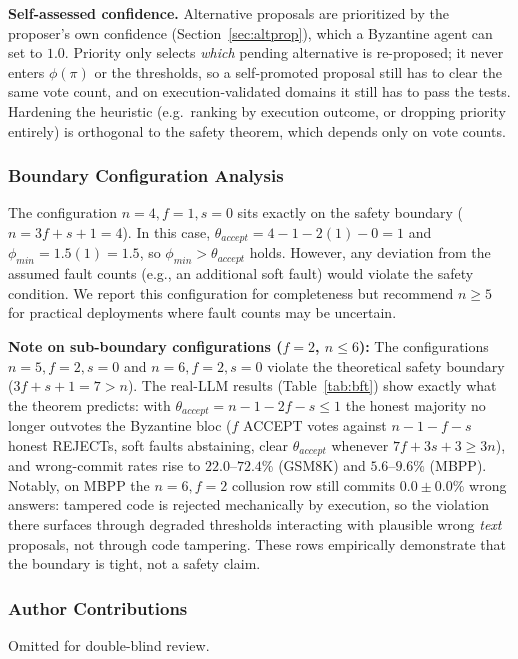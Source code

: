 \documentclass{article}
\begin{document}
\textbf{Self-assessed confidence.} Alternative proposals are prioritized by the proposer's own confidence (Section~\ref{sec:altprop}), which a Byzantine agent can set to $1.0$. Priority only selects \emph{which} pending alternative is re-proposed; it never enters $\phi(\pi)$ or the thresholds, so a self-promoted proposal still has to clear the same vote count, and on execution-validated domains it still has to pass the tests. Hardening the heuristic (e.g.\ ranking by execution outcome, or dropping priority entirely) is orthogonal to the safety theorem, which depends only on vote counts.

\subsubsection{Boundary Configuration Analysis}

The configuration $n = 4, f = 1, s = 0$ sits exactly on the safety boundary ($n = 3f + s + 1 = 4$). In this case, $\theta_{accept} = 4 - 1 - 2(1) - 0 = 1$ and $\phi_{min} = 1.5(1) = 1.5$, so $\phi_{min} > \theta_{accept}$ holds. However, any deviation from the assumed fault counts (e.g., an additional soft fault) would violate the safety condition. We report this configuration for completeness but recommend $n \geq 5$ for practical deployments where fault counts may be uncertain.

\textbf{Note on sub-boundary configurations ($f{=}2$, $n \leq 6$):} The configurations $n = 5, f = 2, s = 0$ and $n = 6, f = 2, s = 0$ violate the theoretical safety boundary ($3f + s + 1 = 7 > n$). The real-LLM results (Table~\ref{tab:bft}) show exactly what the theorem predicts: with $\theta_{accept} = n - 1 - 2f - s \leq 1$ the honest majority no longer outvotes the Byzantine bloc ($f$ ACCEPT votes against $n{-}1{-}f{-}s$ honest REJECTs, soft faults abstaining, clear $\theta_{accept}$ whenever $7f + 3s + 3 \geq 3n$), and wrong-commit rates rise to $22.0$--$72.4\%$ (GSM8K) and $5.6$--$9.6\%$ (MBPP). Notably, on MBPP the $n{=}6, f{=}2$ collusion row still commits $0.0 \pm 0.0\%$ wrong answers: tampered code is rejected mechanically by execution, so the violation there surfaces through degraded thresholds interacting with plausible wrong \emph{text} proposals, not through code tampering. These rows empirically demonstrate that the boundary is tight, not a safety claim.

\subsubsection*{Author Contributions}
Omitted for double-blind review.
\end{document}
